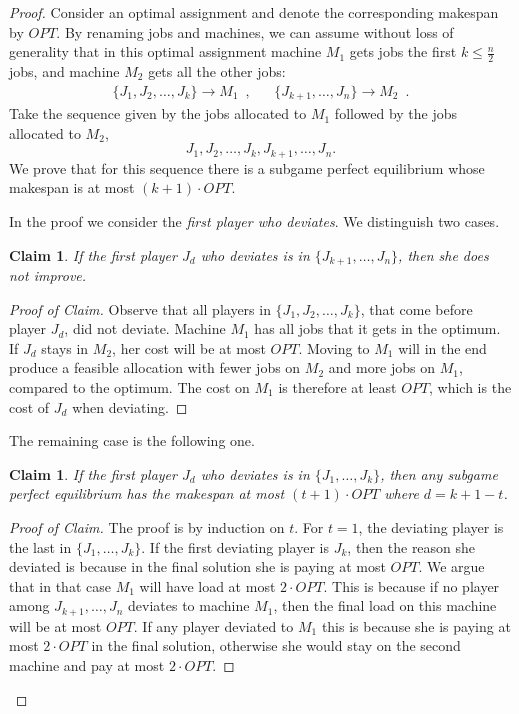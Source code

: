 \documentclass[12pt,a4paper]{article}
\newtheorem{claim}[lemma]{Claim}
\theoremstyle{definition}
\theoremstyle{remark}
\begin{document}
\begin{proof}
Consider an optimal assignment and denote the corresponding makespan by $OPT$. By renaming jobs and machines, we can assume without loss of generality that in this optimal assignment machine $M_1$ gets jobs the first $k\leq \frac{n}{2}$ jobs, and machine $M_2$ gets all the other jobs:
\begin{align*}
\{J_1,J_2,\ldots, J_k\} \rightarrow M_1 \enspace,  && \{J_{k+1}, \ldots, J_n\} \rightarrow M_2 \enspace .
\end{align*}
Take the sequence given by the jobs allocated to $M_1$ followed by the jobs allocated to $M_2$, 
$$J_1, J_2, \ldots, J_k, J_{k+1},\ldots, J_n.$$ We prove that for this sequence there is a subgame perfect equilibrium whose makespan is at most $(k+1)\cdot OPT$. 

In the proof we consider the \emph{first player who deviates}. We distinguish two cases. 

\begin{claim}
	If the first player $J_d$ who deviates is in $\{J_{k+1}, \ldots, J_n\}$, then she does not improve. 
\end{claim}
\begin{proof}[Proof of Claim]
	Observe that all players in $\{J_1,J_2,\ldots, J_k\}$, that come before player $J_d$, did not deviate. Machine $M_1$ has all jobs that it gets in the optimum. If $J_d$ stays in $M_2$, her cost will be at most $OPT$. Moving to $M_1$ will in the end produce a feasible allocation with fewer jobs on $M_2$ and more jobs on $M_1$, compared to the optimum. The cost on $M_1$ is therefore at least $OPT$, which is the cost of $J_d$ when deviating.  
\end{proof}

The remaining  case is the following one.

\begin{claim}
	If the first player $J_d$ who deviates is in $\{J_{1}, \ldots, J_k\}$, then any subgame perfect equilibrium has the makespan at most $(t+1)\cdot OPT$ where $d=k+1-t$.
\end{claim} 
\begin{proof}[Proof of Claim]
	The proof is by induction on $t$. For $t=1$, the deviating player is the last in $\{J_{1}, \ldots, J_k\}$. If the first deviating player is $J_k$, then the reason she deviated is because in the final solution she is paying at most $OPT$. We argue that in that case $M_1$ will have load at most  $2\cdot OPT$. This is because if no player among $J_{k+1},\ldots, J_n$ deviates to machine $M_1$, then the final load on this machine will be at most $OPT$. If any player deviated to $M_1$ this is because she is paying at most $2\cdot OPT$ in the final solution, otherwise she would stay on the second machine and pay at most $2\cdot OPT$.
	

\end{proof}
\end{proof}
\end{document}
